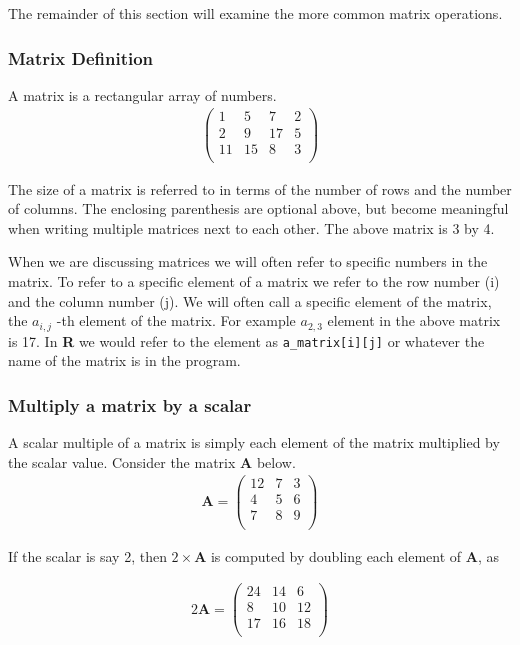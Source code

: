 The remainder of this section will examine the more common matrix operations.
\subsubsection{Matrix Definition}
A matrix is a rectangular array of numbers.
\begin{gather}
\begin{pmatrix}
1 & 5 & 7 & 2\\
2 & 9 & 17 & 5 \\
11 & 15 & 8 & 3 \\
\end{pmatrix}
\end{gather}

The size of a matrix is referred to in terms of the number of rows and the number of columns.  The enclosing parenthesis are optional above, but become meaningful when writing multiple matrices next to each other.
The above matrix is 3 by 4.  

When we are discussing matrices we will often refer to specific numbers in the matrix.  
To refer to a specific element of a matrix we refer to the row number (i) and the column number (j).  
We will often call a specific element of the matrix, the $a_{i,j}$ -th element of the matrix.  For example $a_{2,3}$ element in the above matrix is 17.  
In \textbf{R} we would refer to the element as \texttt{a\_matrix[i][j]} or whatever the name of the matrix is in the program.

\subsubsection{Multiply a matrix by a scalar}
A scalar multiple of a matrix is simply each element of the matrix multiplied by the scalar value.
 Consider the matrix $\mathbf{A}$ below.
\begin{gather}
\mathbf{A}=
\begin{pmatrix}
12 & 7 & 3 \\
4 & 5 &6 \\
7 & 8 & 9 \\
\end{pmatrix}
\end{gather}

If the scalar is say 2, then $2 \times \mathbf{A}$ is computed by doubling each element of $\mathbf{A}$, as

\begin{gather}
2\mathbf{A}=
\begin{pmatrix}
24 & 14 & 6\\
8 & 10 & 12 \\
17 & 16 & 18 \\
\end{pmatrix}
\end{gather}

